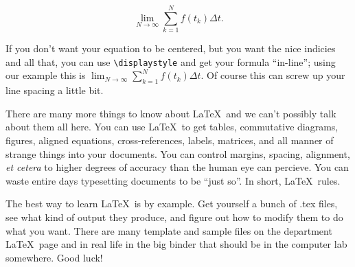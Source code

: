 \documentclass{article}
\begin{document}
$$\lim_{N \to \infty} \sum_{k=1}^N f(t_k) \Delta t.$$

If you don't want your equation to be centered, but you want the nice 
indicies and all that, you can use \verb|\displaystyle| and get your 
formula ``in-line''; using our example this is 
$\displaystyle \lim_{N \to \infty} \sum_{k=1}^N f(t_k) \Delta t.$  Of 
course this can screw up your line spacing a little bit.

There are many more things to know about \LaTeX\ and we can't 
possibly talk about them all here.
You can use \LaTeX\ to get tables, commutative diagrams, figures, 
aligned equations, cross-references, labels, matrices, and all manner 
of strange things into your documents.  You can control margins, 
spacing, alignment, {\it et cetera} to higher degrees of accuracy than 
the human eye can percieve.  You can waste entire days typesetting 
documents to be ``just so''.  In short, \LaTeX\ rules.

The best way to learn \LaTeX\ is by example. Get yourself a bunch
of .tex files, see what kind of output they produce, and figure out how
to modify them to do what you want.  There are many template and 
sample files on the department \LaTeX\ page and in real life in the 
big binder that should be in the computer lab somewhere.  Good luck!
\end{document}
